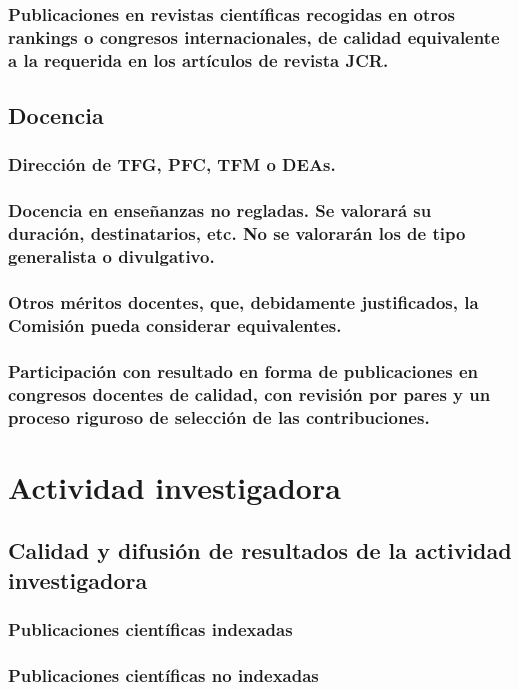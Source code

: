 \newpage\subsubsection{Publicaciones en revistas científicas recogidas en otros rankings o congresos internacionales, de calidad equivalente a la requerida en los artículos de revista JCR.}
\newpage
\newpage
\newpage
\newpage\subsection{Docencia}
\newpage\subsubsection{Dirección de TFG, PFC, TFM o DEAs.}
\newpage\subsubsection{Docencia en enseñanzas no regladas. Se valorará su duración, destinatarios, etc. No se valorarán los de tipo generalista o divulgativo.}
\newpage\subsubsection{Otros méritos docentes, que, debidamente justificados, la Comisión pueda considerar equivalentes.}
\newpage\subsubsection{Participación con resultado en forma de publicaciones en congresos docentes de calidad, con revisión por pares y un proceso riguroso de selección de las contribuciones.}
\newpage\section{Actividad investigadora}
\newpage\subsection{Calidad y difusión de resultados de la actividad investigadora}
\newpage\subsubsection{Publicaciones científicas indexadas}
\newpage\subsubsection{Publicaciones científicas no indexadas}
